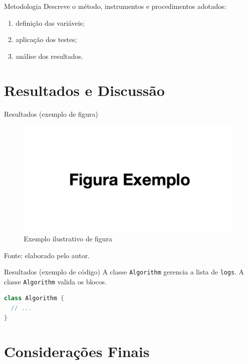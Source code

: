 \documentclass[aspectratio=169]{beamer}
\newcommand{\code}[1]{\texttt{#1}}
\begin{document}
\begin{frame}{Metodologia}
Descreve o método, instrumentos e procedimentos adotados:

\begin{enumerate}[label=\alph*), itemsep=2pt]
  \item definição das variáveis;
  \item aplicação dos testes;
  \item análise dos resultados.
\end{enumerate}
\end{frame}

\section{Resultados e Discussão}

\begin{frame}{Resultados (exemplo de figura)}
\begin{figure}
  \includegraphics[width=0.72\linewidth]{figura.png}
  \caption{Exemplo ilustrativo de figura}
\end{figure}
{\tiny Fonte: elaborado pelo autor.}
\end{frame}

\begin{frame}[fragile]{Resultados (exemplo de código)}
A classe \code{Algorithm} gerencia a lista de \code{logs}.  
A classe \lstinline!Algorithm! valida os blocos.
\begin{lstlisting}[language=Java, caption={Exemplo de classe}, label={lst:ex}]
class Algorithm {
  // ...
}
\end{lstlisting}
\end{frame}

\section{Considerações Finais}
\end{document}
